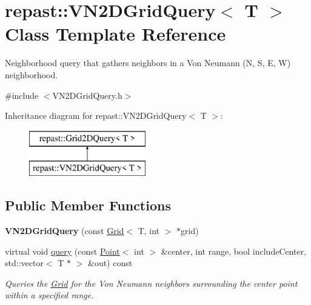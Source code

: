 \hypertarget{classrepast_1_1_v_n2_d_grid_query}{\section{repast\-:\-:V\-N2\-D\-Grid\-Query$<$ T $>$ Class Template Reference}
\label{classrepast_1_1_v_n2_d_grid_query}
}


Neighborhood query that gathers neighbors in a Von Neumann (N, S, E, W) neighborhood.  




{\ttfamily \#include $<$V\-N2\-D\-Grid\-Query.\-h$>$}

Inheritance diagram for repast\-:\-:V\-N2\-D\-Grid\-Query$<$ T $>$\-:\begin{figure}[H]
\begin{center}
\leavevmode
\includegraphics[height=2.000000cm]{classrepast_1_1_v_n2_d_grid_query}
\end{center}
\end{figure}
\subsection*{Public Member Functions}
\begin{DoxyCompactItemize}
\item 
\hypertarget{classrepast_1_1_v_n2_d_grid_query_aa259cd847c0beb8e78f1fc10d0575b9d}{{\bfseries V\-N2\-D\-Grid\-Query} (const \hyperlink{classrepast_1_1_grid}{Grid}$<$ T, int $>$ $\ast$grid)}\label{classrepast_1_1_v_n2_d_grid_query_aa259cd847c0beb8e78f1fc10d0575b9d}

\item 
virtual void \hyperlink{classrepast_1_1_v_n2_d_grid_query_a650d78bb1a0038e0f676121e90052873}{query} (const \hyperlink{classrepast_1_1_point}{Point}$<$ int $>$ \&center, int range, bool include\-Center, std\-::vector$<$ T $\ast$ $>$ \&out) const 
\begin{DoxyCompactList}\small\item\em Queries the \hyperlink{classrepast_1_1_grid}{Grid} for the Von Neumann neighbors surrounding the center point within a specified range. \end{DoxyCompactList}\end{DoxyCompactItemize}
